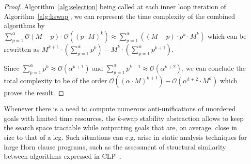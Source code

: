 \begin{proof}
	Algorithm~\ref{alg:selection} being called at each inner loop iteration of Algorithm~\ref{alg:kswap}, we can represent the time complexity of the combined algorithms by
	$\sum\limits_{p=1}^{\alpha}\mathcal{O}(M-p) \cdot \mathcal{O}((p\cdot M)^k) \approx \sum\limits_{p=1}^{\alpha} \left((M-p)\cdot p^k\cdot M^k\right)$
	which can be rewritten as $
	M^{k+1}\cdot \left(\sum\limits_{p=1}^{\alpha} p^k\right) - M^k \cdot \left(\sum\limits_{p=1}^{\alpha} p^{k+1}\right)$.
	
	Since $\sum\limits_{p=1}^{\alpha} p^k \approx \mathcal{O}(\alpha^{k+1})$ and $\sum\limits_{p=1}^{\alpha} p^{k+1} \approx \mathcal{O}(\alpha^{k+2})$, we can conclude the total complexity to be of the order $\mathcal{O}((\alpha\cdot M)^{k+1}) - \mathcal{O}(\alpha^{k+2}\cdot M^k)$ which proves the result.
\end{proof}

Whenever there is a need to compute numerous anti-unifications of unordered goals with limited time resources, the $k$-swap stability abstraction allows to keep the search space tractable while outputting goals that are, on average, close in size to that of a lcg. Such situations can e.g. arise in static analysis techniques for large Horn clause programs, such as the assessment of structural similarity between algorithms expressed in CLP~\cite{clones}. 

